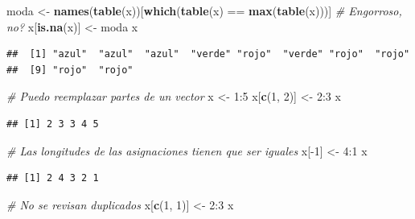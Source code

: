 \documentclass[]{article}
\newenvironment{Shaded}{\begin{snugshade}}{\end{snugshade}}
\newcommand{\KeywordTok}[1]{\textcolor[rgb]{0.13,0.29,0.53}{\textbf{{#1}}}}
\newcommand{\DecValTok}[1]{\textcolor[rgb]{0.00,0.00,0.81}{{#1}}}
\newcommand{\StringTok}[1]{\textcolor[rgb]{0.31,0.60,0.02}{{#1}}}
\newcommand{\CommentTok}[1]{\textcolor[rgb]{0.56,0.35,0.01}{\textit{{#1}}}}
\newcommand{\NormalTok}[1]{{#1}}
\begin{document}
\begin{Shaded}
\begin{Highlighting}[]
\NormalTok{moda <-}\StringTok{ }\KeywordTok{names}\NormalTok{(}\KeywordTok{table}\NormalTok{(x))[}\KeywordTok{which}\NormalTok{(}\KeywordTok{table}\NormalTok{(x) ==}\StringTok{ }\KeywordTok{max}\NormalTok{(}\KeywordTok{table}\NormalTok{(x)))] }\CommentTok{# Engorroso, no?}
\NormalTok{x[}\KeywordTok{is.na}\NormalTok{(x)] <-}\StringTok{ }\NormalTok{moda}
\NormalTok{x}
\end{Highlighting}
\end{Shaded}

\begin{verbatim}
##  [1] "azul"  "azul"  "azul"  "verde" "rojo"  "verde" "rojo"  "rojo" 
##  [9] "rojo"  "rojo"
\end{verbatim}

\begin{Shaded}
\begin{Highlighting}[]
\CommentTok{# Puedo reemplazar partes de un vector}
\NormalTok{x <-}\StringTok{ }\DecValTok{1}\NormalTok{:}\DecValTok{5}
\NormalTok{x[}\KeywordTok{c}\NormalTok{(}\DecValTok{1}\NormalTok{, }\DecValTok{2}\NormalTok{)] <-}\StringTok{ }\DecValTok{2}\NormalTok{:}\DecValTok{3}
\NormalTok{x}
\end{Highlighting}
\end{Shaded}

\begin{verbatim}
## [1] 2 3 3 4 5
\end{verbatim}

\begin{Shaded}
\begin{Highlighting}[]
\CommentTok{# Las longitudes de las asignaciones tienen que ser iguales}
\NormalTok{x[-}\DecValTok{1}\NormalTok{] <-}\StringTok{ }\DecValTok{4}\NormalTok{:}\DecValTok{1}
\NormalTok{x}
\end{Highlighting}
\end{Shaded}

\begin{verbatim}
## [1] 2 4 3 2 1
\end{verbatim}

\begin{Shaded}
\begin{Highlighting}[]
\CommentTok{# No se revisan duplicados}
\NormalTok{x[}\KeywordTok{c}\NormalTok{(}\DecValTok{1}\NormalTok{, }\DecValTok{1}\NormalTok{)] <-}\StringTok{ }\DecValTok{2}\NormalTok{:}\DecValTok{3}
\NormalTok{x}
\end{Highlighting}
\end{Shaded}
\end{document}

